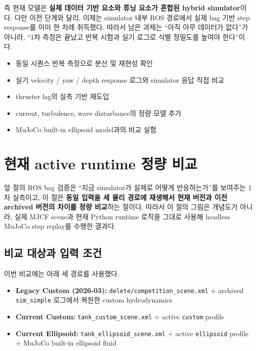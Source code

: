 \documentclass[11pt,a4paper]{article}
\newcommand{\code}[1]{\nolinkurl{#1}}
\begin{document}
즉 현재 모델은 \textbf{실제 데이터 기반 요소와 튜닝 요소가 혼합된 hybrid simulator}이다. 다만 이전 단계와 달리, 이제는 simulator 내부 ROS 경로에서 실제 bag 기반 step response를 이미 한 차례 취득했다. 따라서 남은 과제는 ``아직 아무 데이터가 없다''가 아니라, ``1차 측정은 끝났고 반복 시험과 실기 로그로 식별 정밀도를 높여야 한다''이다.

\begin{itemize}[leftmargin=2em]
  \item 동일 시퀀스 반복 측정으로 분산 및 재현성 확인
  \item 실기 velocity / yaw / depth response 로그와 simulator 응답 직접 비교
  \item thruster lag의 실측 기반 재도입
  \item current, turbulence, wave disturbance의 정량 모델 추가
  \item MuJoCo built-in ellipsoid model과의 비교 실험
\end{itemize}

\section{현재 active runtime 정량 비교}

앞 절의 ROS bag 검증은 ``지금 simulator가 실제로 어떻게 반응하는가''를 보여주는 1차 실측이고, 이 절은 \textbf{동일 입력을 세 물리 경로에 재생해서 현재 버전과 이전 archived 버전의 차이를 정량 비교}하는 절이다. 따라서 이 절의 그림은 개념도가 아니라, 실제 MJCF scene과 현재 Python runtime 로직을 그대로 사용해 headless MuJoCo step replay를 수행한 결과다.

\subsection{비교 대상과 입력 조건}

이번 비교에는 아래 세 경로를 사용했다.

\begin{itemize}[leftmargin=2em]
  \item \textbf{Legacy Custom (2026-03):} \code{delete/competition\_scene.xml} + archived \code{sim\_simple} 로그에서 복원한 custom hydrodynamics
  \item \textbf{Current Custom:} \code{tank\_custom\_scene.xml} + active \code{custom} profile
  \item \textbf{Current Ellipsoid:} \code{tank\_ellipsoid\_scene.xml} + active \code{ellipsoid} profile + MuJoCo built-in ellipsoid fluid
\end{itemize}
\end{document}
